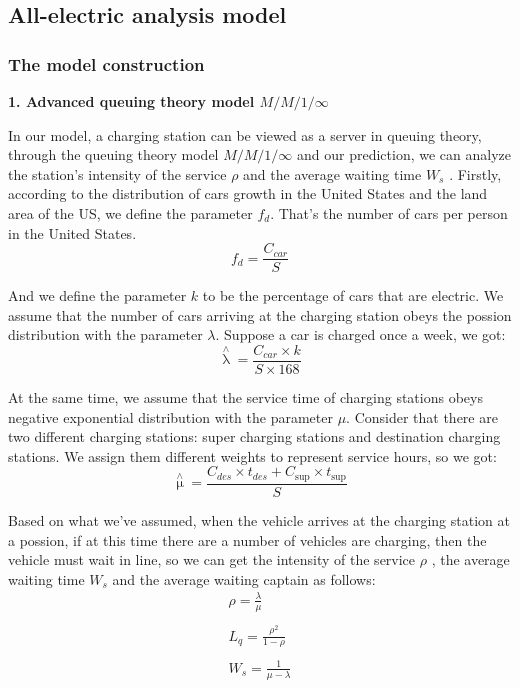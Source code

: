 \documentclass[12pt]{article}  %
\begin{document}
\subsection{All-electric analysis model}
\subsubsection{The model construction}
\textbf{1. Advanced queuing theory model $M/M/1/\infty $}

In our model, a charging station can be viewed as a server in queuing theory, through the queuing theory model $M/M/1/\infty $ and our prediction, we can analyze the station's intensity of the service $\rho $ and the average waiting time ${W_s}$ . 
Firstly, according to the distribution of cars growth in the United States and the land area of the US, we define the parameter ${f_d}$. That's the number of cars per person in the United States.
\begin{equation}\label{eq:fd}
{f_d} = \frac{C_{car}}{S}
\end{equation}

And we define the parameter $k$ to be the percentage of cars that are electric. 
We assume that the number of cars arriving at the charging station obeys the possion distribution with the parameter $\lambda $. Suppose a car is charged once a week, we got:
\begin{equation}\label{eq:lambda}
\mathop \lambda \limits^ \wedge   = \frac{{C_{car} \times k}}{{S \times 168}}
\end{equation}

At the same time, we assume that the service time of charging stations obeys negative exponential distribution with the parameter $\mu $. Consider that there are two different charging stations: super charging stations and destination charging stations. We assign them different weights to represent service hours, so we got:
\begin{equation}\label{eq:mu}
\mathop \mu \limits^ \wedge   = \frac{{{C_{des}} \times {t_{des}} + {C_{\sup }} \times {t_{\sup }}}}{S}
\end{equation}

Based on what we've assumed, when the vehicle arrives at the charging station at a possion, if at this time there are a number of vehicles are charging, then the vehicle must wait in line, so we can get the intensity of the service $\rho $ , the average waiting time ${W_s}$ and the average waiting captain as follows:
\begin{equation}\label{eq:queue}
\begin{array}{l}
\rho  = \frac{\lambda }{\mu }\\
\\
{L_q} = \frac{{{\rho ^2}}}{{1 - \rho }}\\
\\
{W_s} = \frac{1}{{\mu  - \lambda }}
\end{array}
\end{equation}
\end{document}
